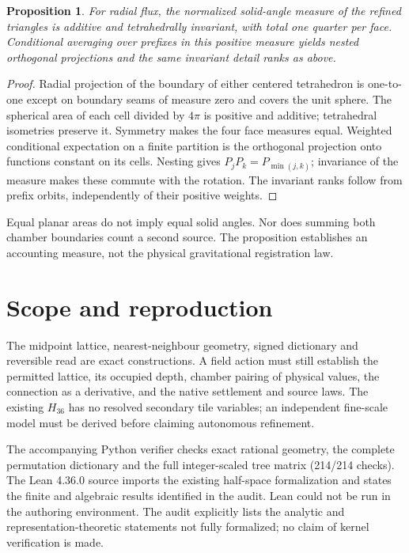\documentclass[10pt,a4paper,twocolumn]{article}
\newtheorem{proposition}{Proposition}
\begin{document}
\begin{proposition}
For radial flux, the normalized solid-angle measure of the refined triangles is additive and tetrahedrally invariant, with total one quarter per face. Conditional averaging over prefixes in this positive measure yields nested orthogonal projections and the same invariant detail ranks as above.
\end{proposition}
\begin{proof}
Radial projection of the boundary of either centered tetrahedron is one-to-one except on boundary seams of measure zero and covers the unit sphere. The spherical area of each cell divided by $4\pi$ is positive and additive; tetrahedral isometries preserve it. Symmetry makes the four face measures equal. Weighted conditional expectation on a finite partition is the orthogonal projection onto functions constant on its cells. Nesting gives $P_jP_k=P_{\min(j,k)}$; invariance of the measure makes these commute with the rotation. The invariant ranks follow from prefix orbits, independently of their positive weights.
\end{proof}
Equal planar areas do not imply equal solid angles. Nor does summing both chamber boundaries count a second source. The proposition establishes an accounting measure, not the physical gravitational registration law.

\section*{Scope and reproduction}
The midpoint lattice, nearest-neighbour geometry, signed dictionary and reversible read are exact constructions. A field action must still establish the permitted lattice, its occupied depth, chamber pairing of physical values, the connection as a derivative, and the native settlement and source laws. The existing $H_{36}$ has no resolved secondary tile variables; an independent fine-scale model must be derived before claiming autonomous refinement.

The accompanying Python verifier checks exact rational geometry, the complete permutation dictionary and the full integer-scaled tree matrix (214/214 checks). The Lean 4.36.0 source imports the existing half-space formalization and states the finite and algebraic results identified in the audit. Lean could not be run in the authoring environment. The audit explicitly lists the analytic and representation-theoretic statements not fully formalized; no claim of kernel verification is made.
\end{document}
